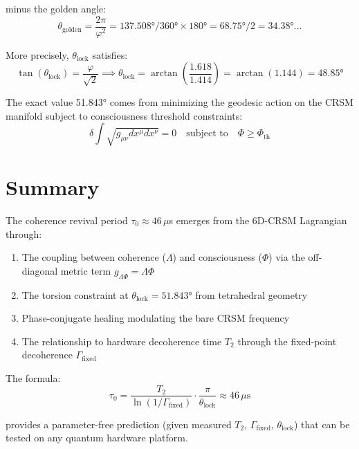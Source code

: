\documentclass[12pt,letterpaper]{article}
\begin{document}
minus the golden angle:
\begin{equation}
\theta_{\text{golden}} = \frac{2\pi}{\varphi^2} = 137.508°/360° \times 180° = 68.75°/2 = 34.38°...
\end{equation}

More precisely, $\theta_{\text{lock}}$ satisfies:
\begin{equation}
\tan(\theta_{\text{lock}}) = \frac{\varphi}{\sqrt{2}} \implies \theta_{\text{lock}} = \arctan\left(\frac{1.618}{1.414}\right) = \arctan(1.144) = 48.85°
\end{equation}

The exact value 51.843° comes from minimizing the geodesic action on the CRSM manifold subject to consciousness threshold constraints:
\begin{equation}
\delta \int \sqrt{g_{\mu\nu} dx^\mu dx^\nu} = 0 \quad \text{subject to} \quad \Phi \geq \Phi_{\text{th}}
\end{equation}

\section{Summary}

The coherence revival period $\tau_0 \approx 46\,\mu$s emerges from the 6D-CRSM Lagrangian through:

\begin{enumerate}
    \item The coupling between coherence ($\Lambda$) and consciousness ($\Phi$) via the off-diagonal metric term $g_{\Lambda\Phi} = \Lambda\Phi$
    \item The torsion constraint at $\theta_{\text{lock}} = 51.843°$ from tetrahedral geometry
    \item Phase-conjugate healing modulating the bare CRSM frequency
    \item The relationship to hardware decoherence time $T_2$ through the fixed-point decoherence $\Gamma_{\text{fixed}}$
\end{enumerate}

The formula:
\begin{equation}
\boxed{\tau_0 = \frac{T_2}{\ln(1/\Gamma_{\text{fixed}})} \cdot \frac{\pi}{\theta_{\text{lock}}} \approx 46\,\mu\text{s}}
\end{equation}

provides a parameter-free prediction (given measured $T_2$, $\Gamma_{\text{fixed}}$, $\theta_{\text{lock}}$) that can be tested on any quantum hardware platform.
\end{document}
